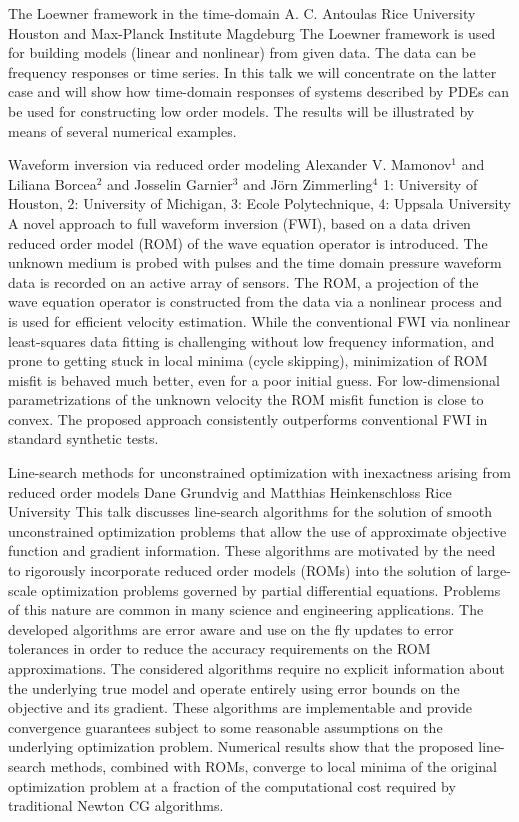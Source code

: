 \begin{addmargin}[2em]{0em}
\vspace{1.5ex}
\abs
{The Loewner framework in the time-domain}
{A. C. Antoulas}
{Rice University Houston and Max-Planck Institute Magdeburg}
{The Loewner framework is used for building models (linear and nonlinear) from given data.
The data can be frequency responses or time series. In this talk we will concentrate on the latter case
and will show how time-domain responses of systems described by PDEs can be used for constructing
low order models. The results will be illustrated by means of several numerical examples.}


\vspace{1.5ex}
\abs
{Waveform inversion via reduced order modeling}
{Alexander V. Mamonov$^{1}$ and Liliana Borcea$^{2}$ and Josselin Garnier$^{3}$ and J\"{o}rn Zimmerling$^{4}$}
{1: University of Houston, 2: University of Michigan, 3: Ecole Polytechnique, 4: Uppsala University}
{A novel approach to full waveform inversion (FWI), based on a data driven reduced order model (ROM) of the wave equation operator is introduced. The unknown medium is probed with pulses and the time domain pressure waveform data is recorded on an active array of sensors. The ROM, a projection of the wave equation operator is constructed from the data via a nonlinear process and is used for efficient velocity estimation. While the conventional FWI via nonlinear least-squares data fitting is challenging without low frequency information, and prone to getting stuck in local minima (cycle skipping), minimization of ROM misfit is behaved much better, even for a poor initial guess. For low-dimensional parametrizations of the unknown velocity the ROM misfit function is close to convex. The proposed approach consistently outperforms conventional FWI in standard synthetic tests.}


\vspace{1.5ex}
\abs
{Line-search methods for unconstrained optimization with inexactness arising from reduced order models}
{Dane Grundvig and Matthias Heinkenschloss}
{Rice University}
{This talk discusses line-search algorithms for the solution of smooth unconstrained optimization problems that allow the use of approximate objective function and gradient information. These algorithms are motivated by the need to rigorously incorporate reduced order models (ROMs) into the solution of large-scale optimization problems governed by partial differential equations. Problems of this nature are common in many science and engineering applications. The developed algorithms are error aware and use on the fly updates to error tolerances in order to reduce the accuracy requirements on the ROM approximations. The considered algorithms require no explicit information about the underlying true model and operate entirely using error bounds on the objective and its gradient. These algorithms are implementable and provide convergence guarantees subject to some reasonable assumptions on the underlying optimization problem. Numerical results show that the proposed line-search methods, combined with ROMs, converge to local minima of the original optimization problem at a fraction of the computational cost required by traditional Newton CG algorithms.}



\end{addmargin}
